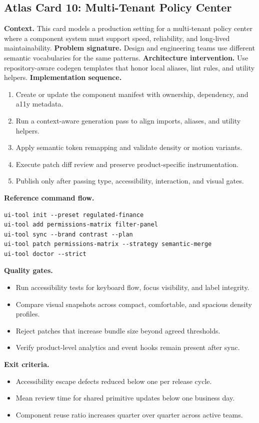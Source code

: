 \subsection*{Atlas Card 10: Multi-Tenant Policy Center}
\textbf{Context.} This card models a production setting for a multi-tenant policy center where a component system must support speed, reliability, and long-lived maintainability.
\textbf{Problem signature.} Design and engineering teams use different semantic vocabularies for the same patterns.
\textbf{Architecture intervention.} Use repository-aware codegen templates that honor local aliases, lint rules, and utility helpers.
\textbf{Implementation sequence.}
\begin{enumerate}[leftmargin=*, itemsep=0.28em]
  \item Create or update the component manifest with ownership, dependency, and a11y metadata.
  \item Run a context-aware generation pass to align imports, aliases, and utility helpers.
  \item Apply semantic token remapping and validate density or motion variants.
  \item Execute patch diff review and preserve product-specific instrumentation.
  \item Publish only after passing type, accessibility, interaction, and visual gates.
\end{enumerate}
\textbf{Reference command flow.}
\begin{verbatim}
ui-tool init --preset regulated-finance
ui-tool add permissions-matrix filter-panel
ui-tool sync --brand contrast --plan
ui-tool patch permissions-matrix --strategy semantic-merge
ui-tool doctor --strict
\end{verbatim}
\textbf{Quality gates.}
\begin{itemize}[leftmargin=*, itemsep=0.24em]
  \item Run accessibility tests for keyboard flow, focus visibility, and label integrity.
  \item Compare visual snapshots across compact, comfortable, and spacious density profiles.
  \item Reject patches that increase bundle size beyond agreed thresholds.
  \item Verify product-level analytics and event hooks remain present after sync.
\end{itemize}
\textbf{Exit criteria.}
\begin{itemize}[leftmargin=*, itemsep=0.24em]
  \item Accessibility escape defects reduced below one per release cycle.
  \item Mean review time for shared primitive updates below one business day.
  \item Component reuse ratio increases quarter over quarter across active teams.
\end{itemize}
\clearpage
